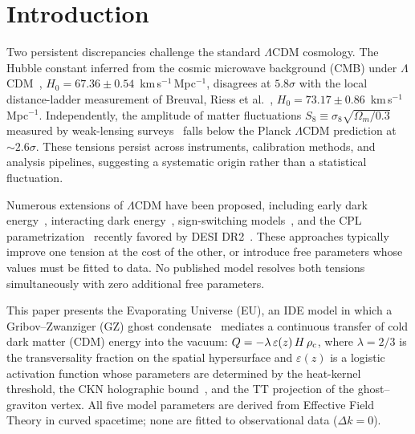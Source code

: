 \documentclass[a4paper,fleqn]{cas-dc}
\newcommand{\rhoc}{\rho_{\rm c}}
\begin{document}
\section{Introduction}
\label{sec:intro}

Two persistent discrepancies challenge the standard
$\Lambda$CDM cosmology. The Hubble constant inferred from
the cosmic microwave background (CMB) under
$\Lambda$CDM~\cite{planck2018},
$H_0 = 67.36 \pm 0.54$~km\,s$^{-1}$\,Mpc$^{-1}$,
disagrees at $5.8\sigma$ with the local distance-ladder
measurement of Breuval, Riess et
al.~\cite{breuval2024},
$H_0 = 73.17 \pm 0.86$~km\,s$^{-1}$\,Mpc$^{-1}$.
Independently, the amplitude of matter fluctuations
$S_8 \equiv \sigma_8\sqrt{\Omega_m/0.3}$ measured by
weak-lensing surveys~\cite{des2022} falls below the
Planck $\Lambda$CDM prediction at $\sim\!2.6\sigma$.
These tensions persist across instruments, calibration
methods, and analysis pipelines, suggesting a systematic
origin rather than a statistical fluctuation.

Numerous extensions of $\Lambda$CDM have been proposed,
including early dark energy~\cite{poulin2019_ede},
interacting dark energy~\cite{divalentino2020},
sign-switching models~\cite{akarsu2023}, and the CPL
parametrization~\cite{chevallier2001,linder2003}
recently favored by DESI DR2~\cite{desi_dr2_2025}.
These approaches typically improve one tension at the
cost of the other, or introduce free parameters whose
values must be fitted to data. No published model
resolves both tensions simultaneously with zero
additional free parameters.

This paper presents the Evaporating Universe (EU), an IDE
model in which a Gribov--Zwanziger (GZ) ghost
condensate~\cite{gribov1978,vandersickel2012}
mediates a continuous transfer of cold dark matter
(CDM) energy into the vacuum:
$Q = -\lambda\,\varepsilon(z)\,H\,\rhoc$, where
$\lambda = 2/3$ is the transversality fraction on the
spatial hypersurface and $\varepsilon(z)$ is a logistic
activation function whose parameters are determined by
the heat-kernel threshold, the CKN holographic
bound~\cite{ckn1999}, and the TT projection of the
ghost--graviton vertex. All five model parameters are
derived from Effective Field Theory in curved spacetime;
none are fitted to observational data ($\Delta k = 0$).
\end{document}
